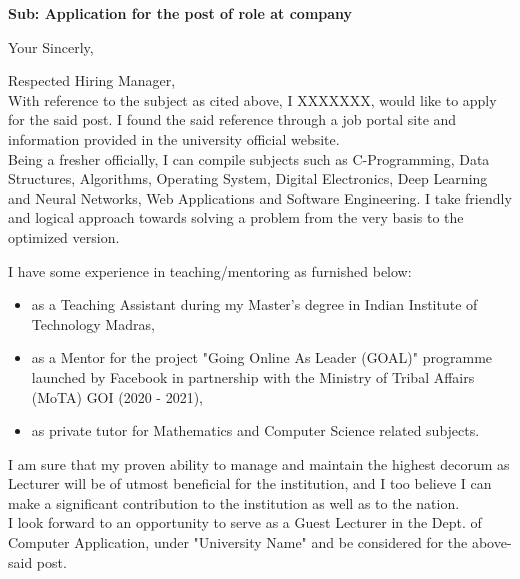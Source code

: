 \documentclass[11pt,a4paper,roman]{moderncv}
\begin{document}
\date{\today}
\opening{\textbf{Sub: Application for the post of {role} at {company}}}
\closing{Your Sincerly, \vspace{-1em}}


\makelettertitle



Respected Hiring Manager,
\\
\vspace{1em}
With reference to the subject as cited above, I XXXXXXX, would like to apply for the said post. I found the said reference through a job portal site and information provided in the university official website.\\

\vspace{1em}
Being a fresher officially, I can compile subjects such as C-Programming, Data Structures, Algorithms, Operating System, Digital Electronics, Deep Learning and Neural Networks, Web Applications and Software Engineering. I take friendly and logical approach towards solving a problem from the very basis to the optimized version.  \\
\vspace{1em}

I have some experience in teaching/mentoring  as furnished below:
\vspace{0.5em}
\begin{itemize}
\item as a Teaching Assistant during my Master's degree in Indian Institute of Technology Madras,
\item as a Mentor for the project "Going Online As Leader (GOAL)" programme launched by Facebook in partnership with the Ministry of Tribal Affairs (MoTA) GOI (2020 - 2021),
\item as private tutor for Mathematics and Computer Science related subjects.
\end{itemize}

\vspace{1em}
I am sure that my proven ability to manage and maintain the highest decorum as Lecturer will be of utmost beneficial for the institution, and I too believe I can make a significant contribution to the institution as well as to the nation. \\

\vspace{1em}
I look forward to an opportunity to serve as a Guest Lecturer in the Dept. of Computer Application, under "University Name" and be considered for the above-said post.

\vspace{0.5cm}


\makeletterclosing
\end{document}
